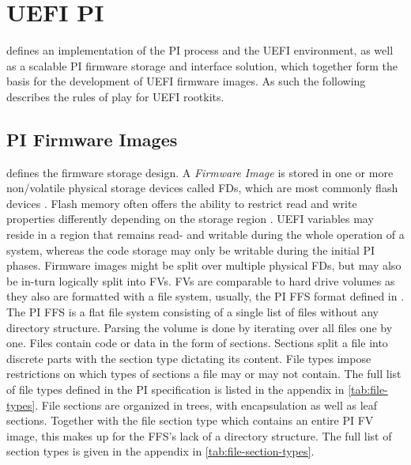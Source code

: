 
\section{\acs{UEFI} \acf{PI}}

\cite{pi-spec} defines an implementation of the \ac{PI} process and the \ac{UEFI} environment, as well as a scalable \ac{PI} firmware storage and interface solution, which together form the basis for the development of \ac{UEFI} firmware images.
As such the following describes the rules of play for \ac{UEFI} rootkits.

\subsection{\acs{PI} Firmware Images}
\label{sec:ueif-pi:pi:pi-firmware-images}

\cite[Vol. 3, 2]{pi-spec} defines the firmware storage design.
A \emph{Firmware Image} is stored in one or more non\-/volatile physical storage devices called \acp{FD}, which are most commonly flash devices \cite[Vol. 3, 2.1]{pi-spec}.
Flash memory often offers the ability to restrict read and write properties differently depending on the storage region \cite[Vol. 3, 2.1.1]{pi-spec}.
\ac{UEFI} variables may reside in a region that remains read- and writable during the whole operation of a system, whereas the code storage may only be writable during the initial \ac{PI} phases.
Firmware images might be split over multiple physical \acp{FD}, but may also be in-turn logically split into \acp{FV}.
\acp{FV} are comparable to hard drive volumes as they also are formatted with a file system, usually, the \ac{PI} \ac{FFS} format defined in \cite[Vol. 3, 2.2]{pi-spec}.
The \ac{PI} \ac{FFS} is a flat file system consisting of a single list of files without any directory structure.
Parsing the volume is done by iterating over all files one by one.
Files contain code or data in the form of sections.
Sections split a file into discrete parts with the section type dictating its content.
File types impose restrictions on which types of sections a file may or may not contain.
The full list of file types defined in the \ac{PI} specification is listed in the appendix in \autoref{tab:file-types}.
File sections are organized in trees, with encapsulation as well as leaf sections.
Together with the file section type  which contains an entire \ac{PI} \ac{FV} image, this makes up for the \ac{FFS}'s lack of a directory structure.
The full list of section types is given in the appendix in \autoref{tab:file-section-types}.

